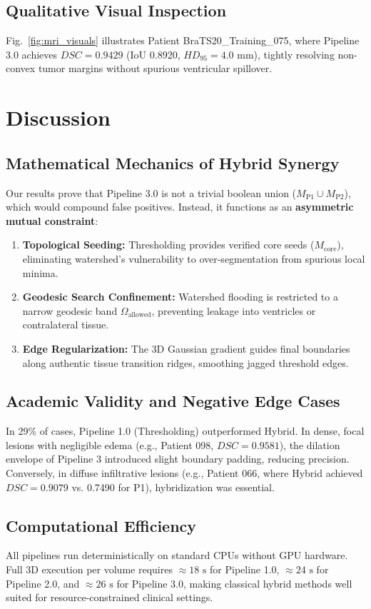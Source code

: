\documentclass[10pt,conference]{IEEEtran}
\begin{document}
\subsection{Qualitative Visual Inspection}
Fig.~\ref{fig:mri_visuals} illustrates Patient BraTS20\_Training\_075, where Pipeline 3.0 achieves $DSC = \mathbf{0.9429}$ (IoU 0.8920, $HD_{95} = 4.0\text{ mm}$), tightly resolving non-convex tumor margins without spurious ventricular spillover.

\section{Discussion}
\subsection{Mathematical Mechanics of Hybrid Synergy}
Our results prove that Pipeline 3.0 is not a trivial boolean union ($M_{\text{P1}} \cup M_{\text{P2}}$), which would compound false positives. Instead, it functions as an \textbf{asymmetric mutual constraint}:
\begin{enumerate}
    \item \textbf{Topological Seeding:} Thresholding provides verified core seeds ($M_{\text{core}}$), eliminating watershed's vulnerability to over-segmentation from spurious local minima.
    \item \textbf{Geodesic Search Confinement:} Watershed flooding is restricted to a narrow geodesic band $\Omega_{\text{allowed}}$, preventing leakage into ventricles or contralateral tissue.
    \item \textbf{Edge Regularization:} The 3D Gaussian gradient guides final boundaries along authentic tissue transition ridges, smoothing jagged threshold edges.
\end{enumerate}

\subsection{Academic Validity and Negative Edge Cases}
In 29\% of cases, Pipeline 1.0 (Thresholding) outperformed Hybrid. In dense, focal lesions with negligible edema (e.g., Patient 098, $DSC = 0.9581$), the dilation envelope of Pipeline 3 introduced slight boundary padding, reducing precision. Conversely, in diffuse infiltrative lesions (e.g., Patient 066, where Hybrid achieved $DSC = 0.9079$ vs. 0.7490 for P1), hybridization was essential.

\subsection{Computational Efficiency}
All pipelines run deterministically on standard CPUs without GPU hardware. Full 3D execution per volume requires $\approx 18\text{ s}$ for Pipeline 1.0, $\approx 24\text{ s}$ for Pipeline 2.0, and $\approx 26\text{ s}$ for Pipeline 3.0, making classical hybrid methods well suited for resource-constrained clinical settings.
\end{document}
